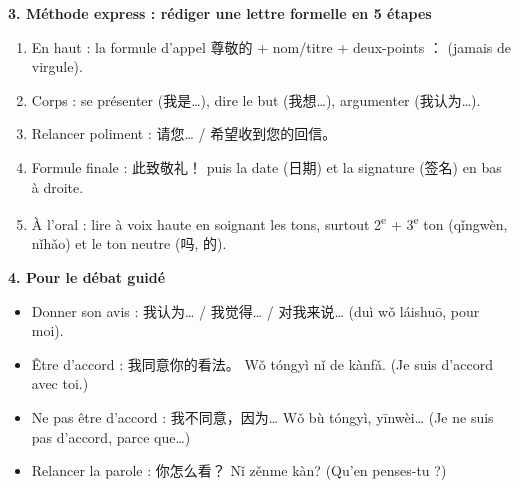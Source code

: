 \documentclass[11pt]{article}
\newcommand{\cle}[1]{{\popxbold\color{popdark}#1}}
\begin{document}
\begin{bilan}
\textbf{3. Méthode express : rédiger une lettre formelle en 5 étapes}
\begin{enumerate}
\item En haut : la \cle{formule d'appel} 尊敬的 + nom/titre + deux-points ： (jamais de virgule).
\item Corps : se \cle{présenter} (我是…), dire le \cle{but} (我想…), \cle{argumenter} (我认为…).
\item \cle{Relancer} poliment : 请您… / 希望收到您的回信。
\item Formule finale : 此致敬礼！ puis la date (日期) et la signature (签名) en bas à droite.
\item À l'oral : lire à voix haute en soignant les tons, surtout 2\textsuperscript{e} + 3\textsuperscript{e} ton (qǐngwèn, nǐhǎo) et le ton neutre (吗, 的).
\end{enumerate}

\textbf{4. Pour le débat guidé}
\begin{itemize}
\item Donner son avis : 我认为… / 我觉得… / 对我来说… (duì wǒ láishuō, pour moi).
\item Être d'accord : 我同意你的看法。 Wǒ tóngyì nǐ de kànfǎ. (Je suis d'accord avec toi.)
\item Ne pas être d'accord : 我不同意，因为… Wǒ bù tóngyì, yīnwèi… (Je ne suis pas d'accord, parce que…)
\item Relancer la parole : 你怎么看？ Nǐ zěnme kàn? (Qu'en penses-tu ?)
\end{itemize}
\end{bilan}
\end{document}
